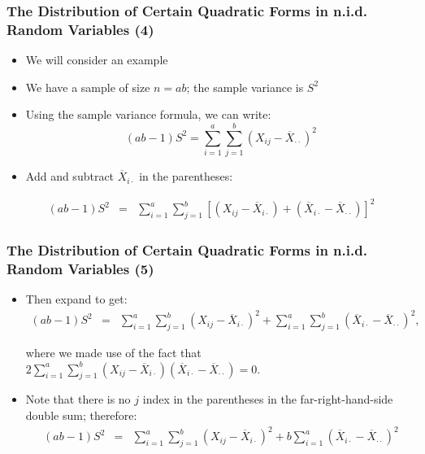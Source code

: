 \documentclass[10pt]{beamer}
\theoremstyle{definition}
\begin{document}
\begin{frame}[fragile]
\frametitle{The Distribution of Certain Quadratic Forms in n.i.d. Random Variables (4)}
\begin{itemize}
	\item We will consider an example
	\item We have a sample of size $n = ab$; the sample variance is $S^{2}$
	\item Using the sample variance formula, we can write:
	\[
		(ab-1)S^{2} = \sum_{i=1}^{a}\sum_{j=1}^{b}(X_{ij} - \overline{X}_{\cdot\cdot})^{2}
	\]
	\item Add and subtract $\overline{X}_{i\cdot}$ in the parentheses:
\end{itemize}
	\[
	\begin{array}{lcl}
		(ab-1)S^{2} & = & \displaystyle \sum_{i=1}^{a}\sum_{j=1}^{b}[(X_{ij} - \overline{X}_{i\cdot}) + (\overline{X}_{i\cdot} - \overline{X}_{\cdot\cdot})]^{2}
	\end{array}
	\]
\end{frame}

\begin{frame}[fragile]
\frametitle{The Distribution of Certain Quadratic Forms in n.i.d. Random Variables (5)}
\begin{itemize}
	\item Then expand to get:
	\[
	\begin{array}{lcl}
		(ab-1)S^{2} & = & \displaystyle \sum_{i=1}^{a}\sum_{j=1}^{b}(X_{ij} - \overline{X}_{i\cdot})^{2} + \sum_{i=1}^{a}\sum_{j=1}^{b}(\overline{X}_{i\cdot} - \overline{X}_{\cdot\cdot})^{2},
	\end{array}
	\]
	
	where we made use of the fact that $\displaystyle 2\sum_{i=1}^{a}\sum_{j=1}^{b}(X_{ij} - \overline{X}_{i\cdot})(\overline{X}_{i\cdot} - \overline{X}_{\cdot\cdot}) = 0$.
	\item Note that there is no $j$ index in the parentheses in the far-right-hand-side double sum; therefore:
	\[
	\begin{array}{lcl}
		(ab-1)S^{2} & = & \displaystyle \sum_{i=1}^{a}\sum_{j=1}^{b}(X_{ij} - \overline{X}_{i\cdot})^{2} + b\sum_{i=1}^{a}(\overline{X}_{i\cdot} - \overline{X}_{\cdot\cdot})^{2}
	\end{array}
	\]
\end{itemize}
\end{frame}
\end{document}
